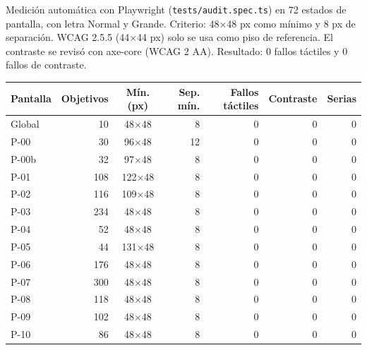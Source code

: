 Medición automática con Playwright (\texttt{tests/audit.spec.ts}) en 72 estados de pantalla, con letra Normal y Grande. Criterio: 48×48 px como mínimo y 8 px de separación. WCAG 2.5.5 (44×44 px) solo se usa como piso de referencia. El contraste se revisó con axe-core (WCAG 2 AA). Resultado: 0 fallos táctiles y 0 fallos de contraste.

\begin{center}\small
\begin{tabular}{|l|r|c|r|r|r|r|}\hline
\textbf{Pantalla} & \textbf{Objetivos} & \textbf{Mín. (px)} & \textbf{Sep. mín.} & \textbf{Fallos táctiles} & \textbf{Contraste} & \textbf{Serias}\\\hline
Global & 10 & 48×48 & 8 & 0 & 0 & 0 \\ \hline
P-00 & 30 & 96×48 & 12 & 0 & 0 & 0 \\ \hline
P-00b & 32 & 97×48 & 8 & 0 & 0 & 0 \\ \hline
P-01 & 108 & 122×48 & 8 & 0 & 0 & 0 \\ \hline
P-02 & 116 & 109×48 & 8 & 0 & 0 & 0 \\ \hline
P-03 & 234 & 48×48 & 8 & 0 & 0 & 0 \\ \hline
P-04 & 52 & 48×48 & 8 & 0 & 0 & 0 \\ \hline
P-05 & 44 & 131×48 & 8 & 0 & 0 & 0 \\ \hline
P-06 & 176 & 48×48 & 8 & 0 & 0 & 0 \\ \hline
P-07 & 300 & 48×48 & 8 & 0 & 0 & 0 \\ \hline
P-08 & 118 & 48×48 & 8 & 0 & 0 & 0 \\ \hline
P-09 & 102 & 48×48 & 8 & 0 & 0 & 0 \\ \hline
P-10 & 86 & 48×48 & 8 & 0 & 0 & 0 \\ \hline
\end{tabular}
\end{center}
